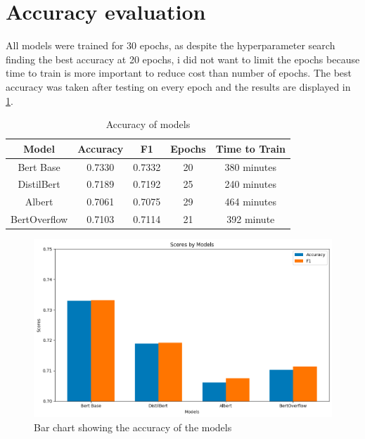 \documentclass{UoYCSproject}
\begin{document}
    \section{Accuracy evaluation}\label{sec:accuracy-evaluation}
    All models were trained for 30 epochs, as despite the hyperparameter search finding the best accuracy at 20 epochs, i did not want to limit the epochs because time to train is more important to reduce cost than number of epochs. The best accuracy was taken after testing on every epoch and the results are displayed in \ref{tab:accuracy}. \par



\begin{table}[h]
\centering
\begin{tabular}{ccccc}
\toprule
Model        & Accuracy & F1     & Epochs  & Time to Train\\
\midrule
Bert Base    & 0.7330   & 0.7332 & 20 & 380 minutes     \\\addlinespace[0.5em]
DistilBert   & 0.7189   & 0.7192 & 25 & 240 minutes     \\\addlinespace[0.5em]
Albert       & 0.7061   & 0.7075 & 29 & 464 minutes    \\\addlinespace[0.5em]
BertOverflow & 0.7103   & 0.7114 & 21 & 392 minute      \\
\bottomrule
\end{tabular}

\caption{Accuracy of models} \label{tab:accuracy}
\end{table}

\begin{figure}[h]
    \centering

        \includegraphics[width=12cm]{./figures/model-accuracy}
        \caption{Bar chart showing the accuracy of the models}
        \label{fig:accuracy}
    \end{figure}
\end{document}
